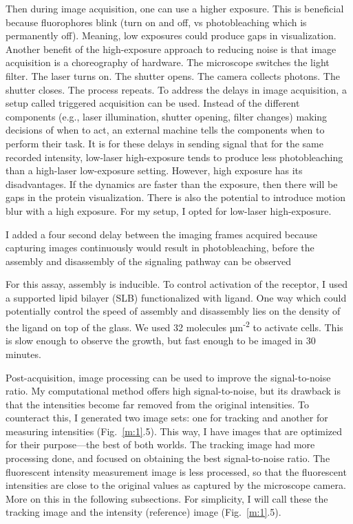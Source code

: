 Then during image acquisition, one can use a higher exposure. This is beneficial because fluorophores blink (turn on and off, vs photobleaching which is permanently off). Meaning, low exposures could produce gaps in visualization. Another benefit of the high-exposure approach to reducing noise is that image acquisition is a choreography of hardware. The microscope switches the light filter. The laser turns on. The shutter opens. The camera collects photons. The shutter closes. The process repeats. To address the delays in image acquisition, a setup called triggered acquisition can be used. Instead of the different components (e.g., laser illumination, shutter opening, filter changes) making decisions of when to act, an external machine tells the components when to perform their task. It is for these delays in sending signal that for the same recorded intensity, low-laser high-exposure tends to produce less photobleaching than a high-laser low-exposure setting. However, high exposure has its disadvantages. If the dynamics are faster than the exposure, then there will be gaps in the protein visualization. There is also the potential to introduce motion blur with a high exposure. For my setup, I opted for low-laser high-exposure.

I added a four second delay between the imaging frames acquired because capturing images continuously would result in photobleaching, before the assembly and disassembly of the signaling pathway can be observed

For this assay, assembly is inducible. To control activation of the receptor, I used a supported lipid bilayer (SLB) functionalized with ligand. One way which could potentially control the speed of assembly and disassembly lies on the density of the ligand on top of the glass. We used 32 molecules µm\textsuperscript{-2} to activate cells. This is slow enough to observe the growth, but fast enough to be imaged in 30 minutes.

Post-acquisition, image processing can be used to improve the signal-to-noise ratio. My computational method offers high signal-to-noise, but its drawback is that the intensities become far removed from the original intensities. To counteract this, I generated two image sets: one for tracking and another for measuring intensities (Fig.~\ref{m:1}.5). This way, I have images that are optimized for their purpose---the best of both worlds. The tracking image had more processing done, and focused on obtaining the best signal-to-noise ratio. The fluorescent intensity measurement image is less processed, so that the fluorescent intensities are close to the original values as captured by the microscope camera. More on this in the following subsections. For simplicity, I will call these the tracking image and the intensity (reference) image (Fig.~\ref{m:1}.5).


